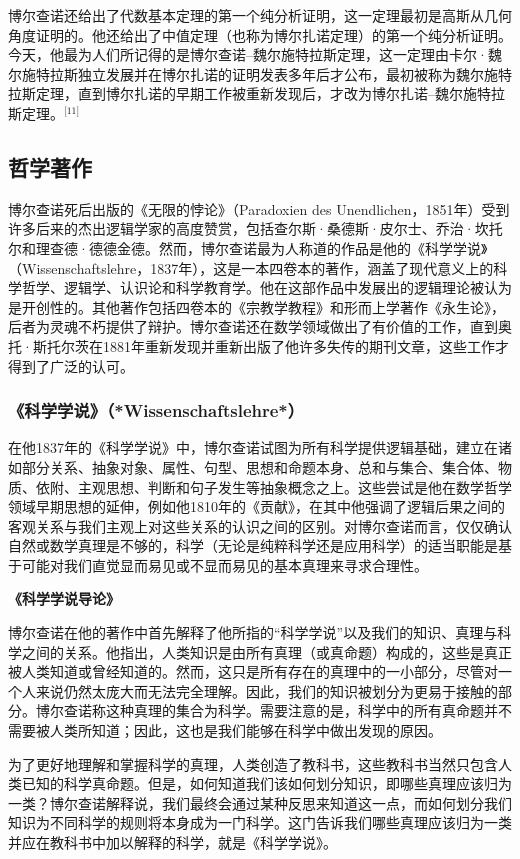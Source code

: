 博尔查诺还给出了代数基本定理的第一个纯分析证明，这一定理最初是高斯从几何角度证明的。他还给出了中值定理（也称为博尔扎诺定理）的第一个纯分析证明。今天，他最为人们所记得的是博尔查诺–魏尔施特拉斯定理，这一定理由卡尔·魏尔施特拉斯独立发展并在博尔扎诺的证明发表多年后才公布，最初被称为魏尔施特拉斯定理，直到博尔扎诺的早期工作被重新发现后，才改为博尔扎诺–魏尔施特拉斯定理。\(^\text{[11]}\)
\subsection{哲学著作}  
博尔查诺死后出版的《无限的悖论》（Paradoxien des Unendlichen，1851年）受到许多后来的杰出逻辑学家的高度赞赏，包括查尔斯·桑德斯·皮尔士、乔治·坎托尔和理查德·德德金德。然而，博尔查诺最为人称道的作品是他的《科学学说》（Wissenschaftslehre，1837年），这是一本四卷本的著作，涵盖了现代意义上的科学哲学、逻辑学、认识论和科学教育学。他在这部作品中发展出的逻辑理论被认为是开创性的。其他著作包括四卷本的《宗教学教程》和形而上学著作《永生论》，后者为灵魂不朽提供了辩护。博尔查诺还在数学领域做出了有价值的工作，直到奥托·斯托尔茨在1881年重新发现并重新出版了他许多失传的期刊文章，这些工作才得到了广泛的认可。
\subsubsection{《科学学说》（*Wissenschaftslehre*）}  
在他1837年的《科学学说》中，博尔查诺试图为所有科学提供逻辑基础，建立在诸如部分关系、抽象对象、属性、句型、思想和命题本身、总和与集合、集合体、物质、依附、主观思想、判断和句子发生等抽象概念之上。这些尝试是他在数学哲学领域早期思想的延伸，例如他1810年的《贡献》，在其中他强调了逻辑后果之间的客观关系与我们主观上对这些关系的认识之间的区别。对博尔查诺而言，仅仅确认自然或数学真理是不够的，科学（无论是纯粹科学还是应用科学）的适当职能是基于可能对我们直觉显而易见或不显而易见的基本真理来寻求合理性。

\textbf{《科学学说导论》} 
 
博尔查诺在他的著作中首先解释了他所指的“科学学说”以及我们的知识、真理与科学之间的关系。他指出，人类知识是由所有真理（或真命题）构成的，这些是真正被人类知道或曾经知道的。然而，这只是所有存在的真理中的一小部分，尽管对一个人来说仍然太庞大而无法完全理解。因此，我们的知识被划分为更易于接触的部分。博尔查诺称这种真理的集合为科学。需要注意的是，科学中的所有真命题并不需要被人类所知道；因此，这也是我们能够在科学中做出发现的原因。

为了更好地理解和掌握科学的真理，人类创造了教科书，这些教科书当然只包含人类已知的科学真命题。但是，如何知道我们该如何划分知识，即哪些真理应该归为一类？博尔查诺解释说，我们最终会通过某种反思来知道这一点，而如何划分我们知识为不同科学的规则将本身成为一门科学。这门告诉我们哪些真理应该归为一类并应在教科书中加以解释的科学，就是《科学学说》。

